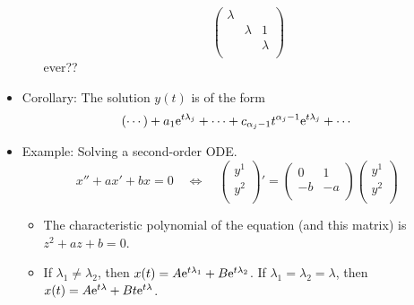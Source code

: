 \documentclass[../notes.tex]{subfiles}
\begin{document}
\begin{itemize}
\begin{itemize}
\begin{equation*}
\begin{pmatrix}
                \lambda &  & \\
                 & \lambda & 1\\
                 &  & \lambda\\
            \end{pmatrix}
        \end{equation*}
        ever??
    \end{itemize}
    \item Corollary: The solution $y(t)$ is of the form
    \begin{equation*}
        (\cdots)+a_1\e[t\lambda_j]+\cdots+c_{\alpha_j-1}t^{\alpha_j-1}\e[t\lambda_j]+\cdots
    \end{equation*}
    \item Example: Solving a second-order ODE.
    \begin{equation*}
        x''+ax'+bx = 0
        \quad\Longleftrightarrow\quad
        \begin{pmatrix}
            y^1\\
            y^2\\
        \end{pmatrix}'
        =
        \begin{pmatrix}
            0 & 1\\
            -b & -a\\
        \end{pmatrix}
        \begin{pmatrix}
            y^1\\
            y^2\\
        \end{pmatrix}
    \end{equation*}
    \begin{itemize}
        \item The characteristic polynomial of the equation (and this matrix) is $z^2+az+b=0$.
        \item If $\lambda_1\neq\lambda_2$, then $x(t)=A\e[t\lambda_1]+B\e[t\lambda_2]$. If $\lambda_1=\lambda_2=\lambda$, then $x(t)=A\e[t\lambda]+Bt\e[t\lambda]$.
    \end{itemize}
\end{itemize}
\end{document}
